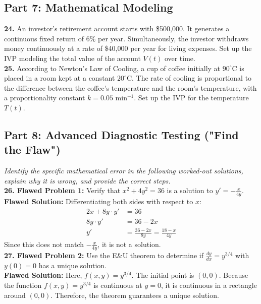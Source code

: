 \documentclass[12pt]{article}
\begin{document}
\subsection*{Part 7: Mathematical Modeling}
\textbf{24.} An investor's retirement account starts with \$500,000. It generates a continuous fixed return of 6\% per year. Simultaneously, the investor withdraws money continuously at a rate of \$40,000 per year for living expenses. Set up the IVP modeling the total value of the account $V(t)$ over time. \\
\textbf{25.} According to Newton's Law of Cooling, a cup of coffee initially at $90^\circ\text{C}$ is placed in a room kept at a constant $20^\circ\text{C}$. The rate of cooling is proportional to the difference between the coffee's temperature and the room's temperature, with a proportionality constant $k = 0.05 \text{ min}^{-1}$. Set up the IVP for the temperature $T(t)$.

\subsection*{Part 8: Advanced Diagnostic Testing ("Find the Flaw")}
\textit{Identify the specific mathematical error in the following worked-out solutions, explain why it is wrong, and provide the correct steps.} \\

\noindent \textbf{26. Flawed Problem 1:} Verify that $x^2 + 4y^2 = 36$ is a solution to $y' = -\frac{x}{4y}$. \\
\textbf{Flawed Solution:} Differentiating both sides with respect to $x$:
\begin{align*}
2x + 8y \cdot y' &= 36 \\
8y \cdot y' &= 36 - 2x \\
y' &= \frac{36 - 2x}{8y} = \frac{18 - x}{4y}
\end{align*}
Since this does not match $-\frac{x}{4y}$, it is not a solution. \\

\noindent \textbf{27. Flawed Problem 2:} Use the E\&U theorem to determine if $\frac{dy}{dx} = y^{3/4}$ with $y(0) = 0$ has a unique solution. \\
\textbf{Flawed Solution:} Here, $f(x,y) = y^{3/4}$. The initial point is $(0,0)$. Because the function $f(x,y) = y^{3/4}$ is continuous at $y = 0$, it is continuous in a rectangle around $(0,0)$. Therefore, the theorem guarantees a unique solution. \\
\end{document}

